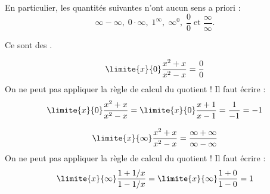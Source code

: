 \begin{frame}
  En particulier, les \og quantités\fg{} suivantes n'ont aucun sens a priori :
  \begin{equation*}
    \infty - \infty,\; 0 \cdot \infty,\; 1^{\infty},\; \infty^{0},\; \frac{0}{0} \;\textrm{et}\; \frac{\infty}{\infty}.
  \end{equation*}
  
  Ce sont des .

  \begin{example}%
    \begin{equation*}
      \limite{x}{0} \frac{x^2 + x}{x^2 - x} = \frac{0}{0}
    \end{equation*}
    On ne peut pas appliquer la règle de calcul du quotient ! Il faut écrire :
    \begin{equation*}
      \limite{x}{0} \frac{x^2 + x}{x^2 - x} = \limite{x}{0} \frac{x + 1}{x - 1} = \frac{1}{-1} = -1
    \end{equation*}
  \end{example}
\end{frame}
\begin{frame}
  \begin{example}%
    \begin{equation*}
      \limite{x}{\infty} \frac{x^2 + x}{x^2 - x} = \frac{\infty+\infty}{\infty - \infty}
    \end{equation*}
    On ne peut pas appliquer la règle de calcul du quotient ! Il faut écrire :
    \begin{equation*}
      \limite{x}{\infty} \frac{1 + 1/x}{1 - 1/x} 
      = \limite{x}{\infty} \frac{1 + 0}{1 - 0} = 1
    \end{equation*}
  \end{example}
\end{frame}
